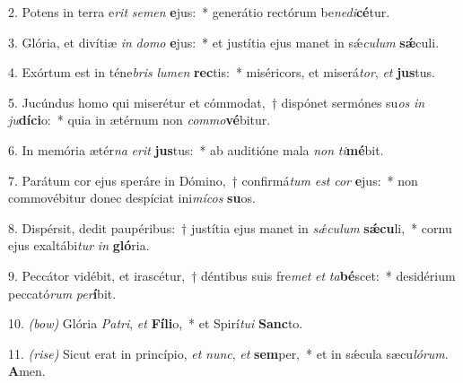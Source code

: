 2. Potens in terra e\textit{rit} \textit{se}\textit{men} \textbf{e}jus:~* generátio rectórum be\textit{ne}\textit{di}\textbf{cé}tur.

3. Glória, et divítiæ \textit{in} \textit{do}\textit{mo} \textbf{e}jus:~* et justítia ejus manet in sǽ\textit{cu}\textit{lum} \textbf{sǽ}culi.

4. Exórtum est in téne\textit{bris} \textit{lu}\textit{men} \textbf{rec}tis:~* miséricors, et miserá\textit{tor}, \textit{et} \textbf{jus}tus.

5. Jucúndus homo qui miserétur et cómmodat,~† dispónet sermónes su\textit{os} \textit{in} \textit{ju}\textbf{dí}\textbf{ci}o:~* quia in ætérnum non \textit{com}\textit{mo}\textbf{vé}bitur.

6. In memória ætér\textit{na} \textit{e}\textit{rit} \textbf{jus}tus:~* ab auditióne mala \textit{non} \textit{ti}\textbf{mé}bit.

7. Parátum cor ejus speráre in Dómino,~† confirmá\textit{tum} \textit{est} \textit{cor} \textbf{e}jus:~* non commovébitur donec despíciat ini\textit{mí}\textit{cos} \textbf{su}os.

8. Dispérsit, dedit paupéribus:~† justítia ejus manet in \textit{sǽ}\textit{cu}\textit{lum} \textbf{sǽ}\textbf{cu}li,~* cornu ejus exaltábi\textit{tur} \textit{in} \textbf{gló}ria.

9. Peccátor vidébit, et irascétur,~† déntibus suis fre\textit{met} \textit{et} \textit{ta}\textbf{bé}scet:~* desidérium peccató\textit{rum} \textit{per}\textbf{í}bit.

10. \textit{(bow)} Glória \textit{Pa}\textit{tri}, \textit{et} \textbf{Fí}\textbf{li}o,~* et Spirí\textit{tu}\textit{i} \textbf{Sanc}to.

11. \textit{(rise)} Sicut erat in princípio, \textit{et} \textit{nunc}, \textit{et} \textbf{sem}per,~* et in sǽcula sæcu\textit{ló}\textit{rum}. \textbf{A}men.